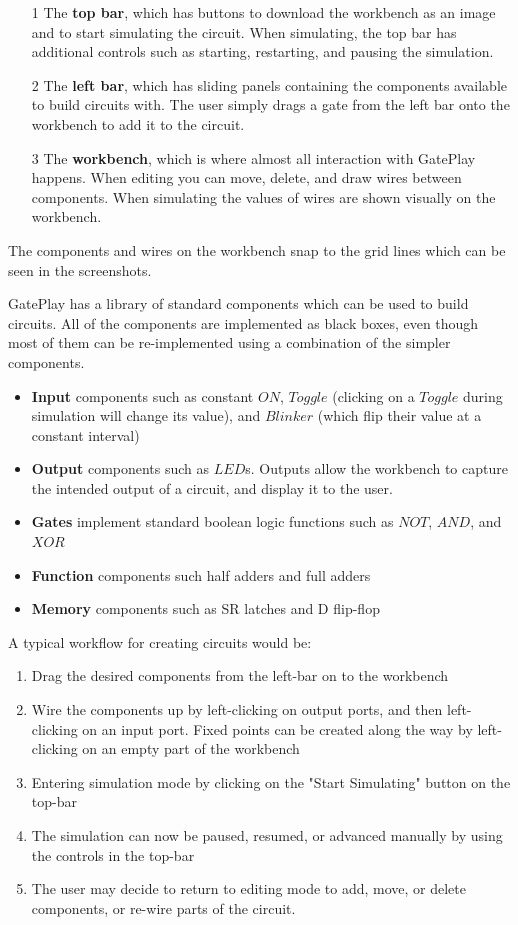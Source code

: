 \begin{itemize}
	\item[1] The \textbf{top bar}, which has buttons to download the workbench as an image and to start simulating the circuit. When simulating, the top bar has additional controls such as starting, restarting, and pausing the simulation.
	\item[2] The \textbf{left bar}, which has sliding panels containing the  components available to build circuits with. The user simply drags a gate from the left bar onto the workbench to add it to the circuit.
	\item[3] The \textbf{workbench}, which is where almost all interaction with GatePlay happens. When editing you can move, delete, and draw wires between components. When simulating the values of wires are shown visually on the workbench.
\end{itemize}

The components and wires on the workbench snap to the grid lines which can be seen in the screenshots.

GatePlay has a library of standard components which can be used to build circuits. All of the components are implemented as black boxes, even though most of them can be re-implemented using a combination of the simpler components.

\begin{itemize}
	\item \textbf{Input} components such as constant $ON$, $Toggle$ (clicking on a $Toggle$ during simulation will change its value), and $Blinker$ (which flip their value at a constant interval)
	\item \textbf{Output} components such as $LED$s. Outputs allow the workbench to capture the intended output of a circuit, and display it to the user.
	\item \textbf{Gates} implement standard boolean logic functions such as $NOT$, $AND$, and $XOR$
	\item \textbf{Function} components such half adders and full adders
	\item \textbf{Memory} components such as SR latches and D flip-flop  
\end{itemize}

A typical workflow for creating circuits would be:

\begin{enumerate}
	\item Drag the desired components from the left-bar on to the workbench
	\item Wire the components up by left-clicking on output ports, and then left-clicking on an input port. Fixed points can be created along the way by left-clicking on an empty part of the workbench
	\item Entering simulation mode by clicking on the "Start Simulating" button on the top-bar
	\item The simulation can now be paused, resumed, or advanced manually by using the controls in the top-bar
	\item The user may decide to return to editing mode to add, move, or delete components, or re-wire parts of the circuit.
\end{enumerate}


